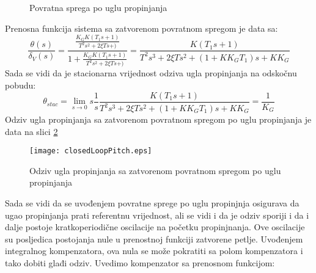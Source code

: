  \begin{figure}[!ht]
     \centering
\caption{Povratna sprega po uglu propinjanja}
\label{fig:slobGyro}
\end{figure}
Prenosna funkcija sistema sa zatvorenom povratnom spregom je data sa:
\begin{equation}
    \frac{\theta (s)}{\delta _V(s)} = \frac{\frac{K_GK(T_1s+1)}{T^2s^2+2\xi Ts+)}}{1+\frac{K_GK(T_1s+1)}{T^2s^2+2\xi Ts+)}}
    =\frac{K(T_1s+1)}{T^2s^3+2\xi Ts^2+(1+KK_GT_1)s+KK_G}
\end{equation}
Sada se vidi da je stacionarna vrijednost odziva ugla propinjanja na odskočnu pobudu:
\begin{equation}
    \theta _{stac} = \lim_{s \to 0} s\frac{1}{s}\frac{K(T_1s+1)}{T^2s^3+2\xi Ts^2+(1+KK_GT_1)s+KK_G} = \frac{1}{K_G}
\end{equation}
Odziv ugla propinjanja sa zatvorenom povratnom spregom po uglu propinjanja je data na slici \ref{fig:closedPitch}
\begin{figure}[!ht]
    \centering 
    \texttt{[image: closedLoopPitch.eps]}
    \caption{Odziv ugla propinjanja sa zatvorenom povratnom spregom po uglu propinjanja}
    \label{fig:closedPitch}
\end{figure}
Sada se vidi da se uvođenjem povratne sprege po uglu propinjnja osigurava da ugao propinjanja prati referentnu 
vrijednost, ali se vidi i da je odziv sporiji  i da i dalje postoje kratkoperiodične oscilacije na početku propinjnanja.
Ove oscilacije su posljedica postojanja nule u prenostnoj funkciji zatvorene petlje. 
Uvođenjem integralnog kompenzatora, ova nula se može pokratiti sa polom kompenzatora i tako dobiti glađi odziv.
Uvedimo kompenzator sa prenosnom funkcijom:
